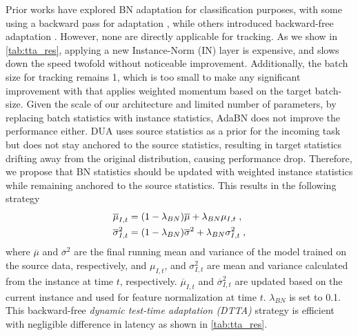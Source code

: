 Prior works have explored BN adaptation for classification purposes, with some using a backward pass for adaptation \cite{niu2022efficient, wang2020tent}, while others introduced backward-free adaptation \cite{pan2018two, schneider2020improving, mirza2022norm, li2016revisiting}. However, none are directly applicable for tracking. As we show in \ref{tab:tta_res}, applying a new Instance-Norm (IN) layer \cite{pan2018two} is expensive, and slows down the speed twofold without noticeable improvement. Additionally, the batch size for tracking remains 1, which is too small to make any significant improvement with \cite{schneider2020improving} that applies weighted momentum based on the target batch-size. Given the scale of our architecture and limited number of parameters, by replacing batch statistics with instance statistics, AdaBN \cite{li2016revisiting} does not improve the performance either. DUA \cite{mirza2022norm} uses source statistics as a prior for the incoming task but does not stay anchored to the source statistics, resulting in target statistics drifting away from the original distribution, causing performance drop. Therefore, we propose that BN statistics should be updated with weighted instance statistics while remaining anchored to the source statistics. This results in the following strategy
\begin{equation}
  \centering
  \label{eq:bn_update}
      \begin{aligned}  
          \overline{\mu}_{I,t} &= (1-\lambda{_{BN}}) \overline{\mu} +  \lambda{_{BN}} \mu_{I,t} \; ,\\
          \overline{\sigma}_{I,t}^2 &= (1-\lambda{_{BN}}) \overline{\sigma}^2 +  \lambda{_{BN}} \sigma_{I,t}^2 \; ,
      \end{aligned}
\end{equation}
where $\overline{\mu}$ and $\overline{\sigma}^2$ are the final running mean and variance of the model trained on the source data, respectively, and $\mu_{I,t}$, and $\sigma_{I,t}^2$ are mean and variance calculated from the instance at time $t$, respectively. $\overline{\mu}_{I,t}$ and $\overline{\sigma}_{I,t}^2$ are updated based on the current instance and used for feature normalization at time $t$. $ \lambda{_{BN}}$ is set to 0.1. This backward-free \emph{dynamic test-time adaptation (DTTA)} strategy is efficient with negligible difference in latency as shown in \ref{tab:tta_res}.







